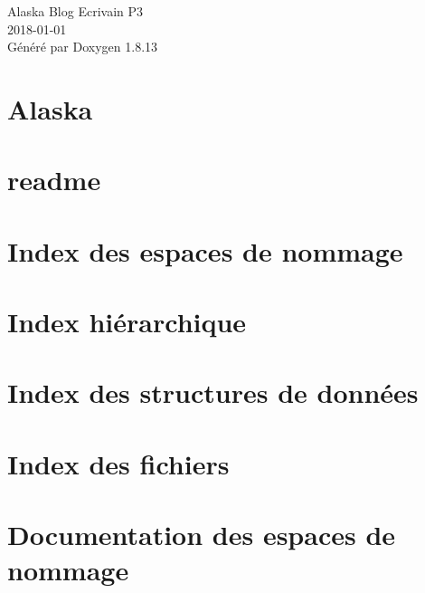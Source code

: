 \documentclass[twoside]{book}
\newcommand{\+}{\discretionary{\mbox{\scriptsize$\hookleftarrow$}}{}{}}
\newcommand{\clearemptydoublepage}{%
  \newpage{\pagestyle{empty}\cleardoublepage}%
}
\begin{document}
\hypersetup{pageanchor=false,
             bookmarksnumbered=true,
             pdfencoding=unicode
            }
\begin{titlepage}
\vspace*{7cm}
\begin{center}%
{\Large Alaska Blog Ecrivain P3 \\[1ex]\large 2018-\/01-\/01 }\\
\vspace*{1cm}
{\large Généré par Doxygen 1.8.13}\\
\end{center}
\end{titlepage}
\clearemptydoublepage
{}
\tableofcontents
\clearemptydoublepage
{}
\hypersetup{pageanchor=true}

\chapter{Alaska}
\label{md__var_www_html__alaska__r_e_a_d_m_e}

\chapter{readme}
\label{md__var_www_html__alaska__web_js_tinymce_langs_readme}

\chapter{Index des espaces de nommage}

\chapter{Index hiérarchique}

\chapter{Index des structures de données}

\chapter{Index des fichiers}

\chapter{Documentation des espaces de nommage}






\end{document}
